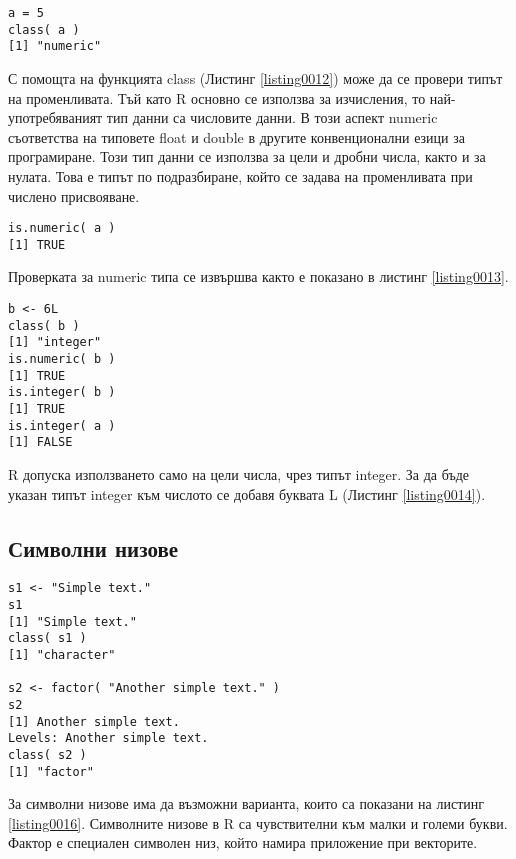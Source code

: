 \begin{lstlisting}[caption=Проверка за типа на променливата, label=listing0012]
a = 5
class( a )
[1] "numeric"
\end{lstlisting}

С помощта на функцията class (Листинг \ref{listing0012}) може да се провери типът на променливата. Тъй като R основно се използва за изчисления, то най-употребяваният тип данни са числовите данни. В този аспект numeric съответства на типовете float и double в другите конвенционални езици за програмиране. Този тип данни се използва за цели и дробни числа, както и за нулата. Това е типът по подразбиране, който се задава на променливата при числено присвояване. 

\begin{lstlisting}[caption=Проверка за типа numeric, label=listing0013]
is.numeric( a )
[1] TRUE
\end{lstlisting}

Проверката за numeric типа се извършва както е показано в листинг \ref{listing0013}.

\begin{lstlisting}[caption=Използване на целочислен тип, label=listing0014]
b <- 6L
class( b )
[1] "integer"
is.numeric( b )
[1] TRUE
is.integer( b )
[1] TRUE
is.integer( a )
[1] FALSE
\end{lstlisting}

R допуска използването само на цели числа, чрез типът integer. За да бъде указан типът integer към числото се добавя буквата L (Листинг \ref{listing0014}).

\subsection{Символни низове}

\begin{lstlisting}[caption=Символни низове в R, label=listing0016]
s1 <- "Simple text."
s1
[1] "Simple text."
class( s1 )
[1] "character"

s2 <- factor( "Another simple text." )
s2
[1] Another simple text.
Levels: Another simple text.
class( s2 )
[1] "factor"
\end{lstlisting}

За символни низове има да възможни варианта, които са показани на листинг \ref{listing0016}. Символните низове в R са чувствителни към малки и големи букви. Фактор е специален символен низ, който намира приложение при векторите. 

